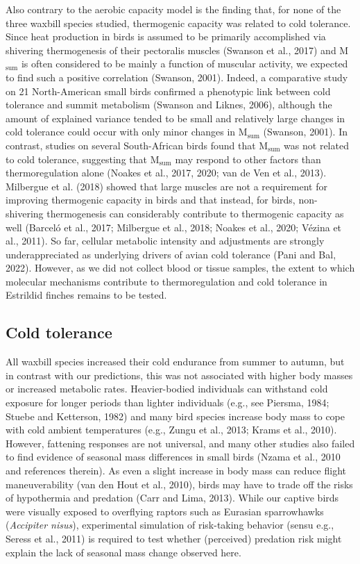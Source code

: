 \documentclass[10pt, twoside]{book} %
\begin{document}
Also contrary to the aerobic capacity model is the finding that, for none of the three waxbill species studied, thermogenic capacity was related to cold tolerance. Since heat production in birds is assumed to be primarily accomplished via shivering thermogenesis of their pectoralis muscles (Swanson et al., 2017) and M$_{\text{sum}}$ is often considered to be mainly a function of muscular activity, we expected to find such a positive correlation (Swanson, 2001). Indeed, a comparative study on 21 North-American small birds confirmed a phenotypic link between cold tolerance and summit metabolism (Swanson and Liknes, 2006), although the amount of explained variance tended to be small and relatively large changes in cold tolerance could occur with only minor changes in M$_{\text{sum}}$ (Swanson, 2001). In contrast, studies on several South-African birds found that M$_{\text{sum}}$ was not related to cold tolerance, suggesting that M$_{\text{sum}}$ may respond to other factors than thermoregulation alone (Noakes et al., 2017, 2020; van de Ven et al., 2013). Milbergue et al. (2018) showed that large muscles are not a requirement for improving thermogenic capacity in birds and that instead, for birds, non-shivering thermogenesis can considerably contribute to thermogenic capacity as well (Barceló et al., 2017; Milbergue et al., 2018; Noakes et al., 2020; Vézina et al., 2011). So far, cellular metabolic intensity and adjustments are strongly underappreciated as underlying drivers of avian cold tolerance (Pani and Bal, 2022). However, as we did not collect blood or tissue samples, the extent to which molecular mechanisms contribute to thermoregulation and cold tolerance in Estrildid finches remains to be tested.\\

\subsection{Cold tolerance}

All waxbill species increased their cold endurance from summer to autumn, but in contrast with our predictions, this was not associated with higher body masses or increased metabolic rates. Heavier-bodied individuals can withstand cold exposure for longer periods than lighter individuals (e.g., see Piersma, 1984; Stuebe and Ketterson, 1982) and many bird species increase body mass to cope with cold ambient temperatures (e.g., Zungu et al., 2013; Krams et al., 2010). However, fattening responses are not universal, and many other studies also failed to find evidence of seasonal mass differences in small birds (Nzama et al., 2010 and references therein). As even a slight increase in body mass can reduce flight maneuverability (van den Hout et al., 2010), birds may have to trade off the risks of hypothermia and predation (Carr and Lima, 2013). While our captive birds were visually exposed to overflying raptors such as Eurasian sparrowhawks (\textit{Accipiter nisus}), experimental simulation of risk-taking behavior (sensu e.g., Seress et al., 2011) is required to test whether (perceived) predation risk might explain the lack of seasonal mass change observed here.\\
\end{document}
